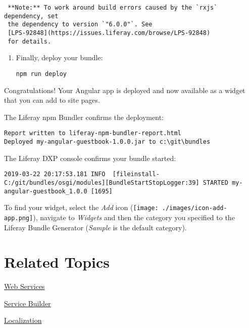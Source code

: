 \noindent\hrulefill

\begin{verbatim}
 **Note:** To work around build errors caused by the `rxjs` dependency, set
 the dependency to version `"6.0.0"`. See
 [LPS-92848](https://issues.liferay.com/browse/LPS-92848)
 for details. 
\end{verbatim}

\noindent\hrulefill

\begin{enumerate}
\def\labelenumi{\arabic{enumi}.}
\setcounter{enumi}{9}
\item
  Finally, deploy your bundle:

\begin{verbatim}
npm run deploy
\end{verbatim}
\end{enumerate}

Congratulations! Your Angular app is deployed and now available as a
widget that you can add to site pages.

The Liferay npm Bundler confirms the deployment:

\begin{verbatim}
Report written to liferay-npm-bundler-report.html
Deployed my-angular-guestbook-1.0.0.jar to c:\git\bundles
\end{verbatim}

The Liferay DXP console confirms your bundle started:

\begin{verbatim}
2019-03-22 20:17:53.181 INFO  [fileinstall-C:/git/bundles/osgi/modules][BundleStartStopLogger:39] STARTED my-angular-guestbook_1.0.0 [1695]
\end{verbatim}

To find your widget, select the \emph{Add} icon
(\texttt{[image: ./images/icon-add-app.png]}), navigate to
\emph{Widgets} and then the category you specified to the Liferay Bundle
Generator (\emph{Sample} is the default category).

\section{Related Topics}\label{related-topics}

\href{/docs/7-2/frameworks/-/knowledge_base/f/web-services}{Web
Services}

\href{/docs/7-2/appdev/-/knowledge_base/a/service-builder}{Service
Builder}

\href{/docs/7-2/frameworks/-/knowledge_base/f/localization}{Localization}

